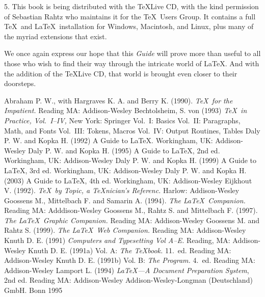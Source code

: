 \documentclass{article}
\begin{document}
5. This book is being distributed with the \TeX Live CD, with the kind
  permission of Sebastian Rahtz who maintains it for the \TeX\ Users Group.
  It contains a full \TeX\ and \LaTeX\ installation for Windows, Macintosh,
  and Linux, plus many of the myriad extensions that exist.

We once again express our hope that this \textsl{Guide} will prove more than
useful to all those who wish to find their way through the intricate world of
\LaTeX. And with the addition of the \TeX Live CD, that world is brought even
closer to their doorsteps.

\newpage

\begin{thebibliography}{\hspace{1.5cm}}
 Abraham P. W., with Hargraves K. A. and Berry K. (1990).
   \textsl{\TeX\ for the Impatient.} Reading MA: Addison-Wesley
 Bechtolsheim, S. von (1993) \textsl{\TeX\ in Practice,
   Vol.\ I--IV,} New York: Springer
 Vol.\ I: Basics
 Vol.\ II: Paragraphs, Math, and Fonts
 Vol.\ III: Tokens, Macros
 Vol.\ IV: Output Routines, Tables
 Daly P. W. and Kopka H. (1992) {A Guide to \LaTeX.}
   Workingham, UK: Addison-Wesley
 Daly P. W. and Kopka H. (1995) {A Guide to \LaTeX,}
   2nd ed. Workingham, UK: Addison-Wesley
 Daly P. W. and Kopka H. (1999) {A Guide to \LaTeX,}
   3rd ed. Workingham, UK: Addison-Wesley
 Daly P. W. and Kopka H. (2003) {A Guide to \LaTeX,}
   4th ed. Workingham, UK: Addison-Wesley
 Eijkhout V. (1992). \textsl{\TeX\ by Topic, a 
   \TeX nician's Referenc.} Harlow: Addison-Wesley
 Goossens M., Mittelbach F. and Samarin A. (1994).
   \textsl{The \LaTeX\ Companion.} Reading MA: Adddison-Wesley
 Goossens M., Rahtz S. and Mittelbach F. (1997).
   \textsl{The \LaTeX\ Graphic Companion.} Reading MA: Addison-Wesley
 Goossens M. and Rahtz S. (1999).
   \textsl{The \LaTeX\ Web Companion.} Reading MA: Addison-Wesley
 Knuth D. E. (1991) \textsl{Computers and Typesetting
   Vol A--E.}  Reading, MA: Addison-Wesley
 Knuth D. E. (1991a) Vol. A: \textsl{The \TeX book.}
   11.~ed. Reading MA: Addison-Wesley
 Knuth D. E. (1991b) Vol. B: \textsl{The Program.}
   4.~ed. Reading MA: Addison-Wesley
 Lamport L. (1994) \textsl{\LaTeX---A Document
   Preparation System}, 2nd ed. Reading MA: Addison-Wesley
    Addison-Wesley-Longman (Deutschland) GmbH. Bonn 1995
\end{thebibliography}
\end{document}

